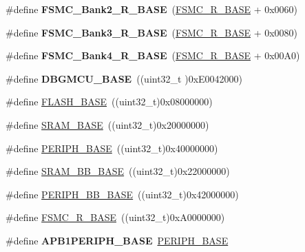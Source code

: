 \begin{DoxyCompactItemize}
\item 
\hypertarget{group___peripheral__memory__map_ga3cb46d62f4f6458e186a5a4c753e4918}{\#define {\bfseries F\-S\-M\-C\-\_\-\-Bank2\-\_\-\-R\-\_\-\-B\-A\-S\-E}~(\hyperlink{group___peripheral__memory__map_gaddf0e199dccba83272b20c9fb4d3aaed}{F\-S\-M\-C\-\_\-\-R\-\_\-\-B\-A\-S\-E} + 0x0060)}\label{group___peripheral__memory__map_ga3cb46d62f4f6458e186a5a4c753e4918}

\item 
\hypertarget{group___peripheral__memory__map_gacf056152c9e5aefcc67db78d1302c0d7}{\#define {\bfseries F\-S\-M\-C\-\_\-\-Bank3\-\_\-\-R\-\_\-\-B\-A\-S\-E}~(\hyperlink{group___peripheral__memory__map_gaddf0e199dccba83272b20c9fb4d3aaed}{F\-S\-M\-C\-\_\-\-R\-\_\-\-B\-A\-S\-E} + 0x0080)}\label{group___peripheral__memory__map_gacf056152c9e5aefcc67db78d1302c0d7}

\item 
\hypertarget{group___peripheral__memory__map_gaf9e5417133160b0bdd0498d982acec19}{\#define {\bfseries F\-S\-M\-C\-\_\-\-Bank4\-\_\-\-R\-\_\-\-B\-A\-S\-E}~(\hyperlink{group___peripheral__memory__map_gaddf0e199dccba83272b20c9fb4d3aaed}{F\-S\-M\-C\-\_\-\-R\-\_\-\-B\-A\-S\-E} + 0x00\-A0)}\label{group___peripheral__memory__map_gaf9e5417133160b0bdd0498d982acec19}

\item 
\hypertarget{group___peripheral__memory__map_ga4adaf4fd82ccc3a538f1f27a70cdbbef}{\#define {\bfseries D\-B\-G\-M\-C\-U\-\_\-\-B\-A\-S\-E}~((uint32\-\_\-t )0x\-E0042000)}\label{group___peripheral__memory__map_ga4adaf4fd82ccc3a538f1f27a70cdbbef}

\item 
\#define \hyperlink{group___peripheral__memory__map_ga23a9099a5f8fc9c6e253c0eecb2be8db}{F\-L\-A\-S\-H\-\_\-\-B\-A\-S\-E}~((uint32\-\_\-t)0x08000000)
\item 
\#define \hyperlink{group___peripheral__memory__map_ga05e8f3d2e5868754a7cd88614955aecc}{S\-R\-A\-M\-\_\-\-B\-A\-S\-E}~((uint32\-\_\-t)0x20000000)
\item 
\#define \hyperlink{group___peripheral__memory__map_ga9171f49478fa86d932f89e78e73b88b0}{P\-E\-R\-I\-P\-H\-\_\-\-B\-A\-S\-E}~((uint32\-\_\-t)0x40000000)
\item 
\#define \hyperlink{group___peripheral__memory__map_gad3548b6e2f017f39d399358f3ac98454}{S\-R\-A\-M\-\_\-\-B\-B\-\_\-\-B\-A\-S\-E}~((uint32\-\_\-t)0x22000000)
\item 
\#define \hyperlink{group___peripheral__memory__map_gaed7efc100877000845c236ccdc9e144a}{P\-E\-R\-I\-P\-H\-\_\-\-B\-B\-\_\-\-B\-A\-S\-E}~((uint32\-\_\-t)0x42000000)
\item 
\#define \hyperlink{group___peripheral__memory__map_gaddf0e199dccba83272b20c9fb4d3aaed}{F\-S\-M\-C\-\_\-\-R\-\_\-\-B\-A\-S\-E}~((uint32\-\_\-t)0x\-A0000000)
\item 
\hypertarget{group___peripheral__memory__map_ga45666d911f39addd4c8c0a0ac3388cfb}{\#define {\bfseries A\-P\-B1\-P\-E\-R\-I\-P\-H\-\_\-\-B\-A\-S\-E}~\hyperlink{group___peripheral__memory__map_ga9171f49478fa86d932f89e78e73b88b0}{P\-E\-R\-I\-P\-H\-\_\-\-B\-A\-S\-E}}\label{group___peripheral__memory__map_ga45666d911f39addd4c8c0a0ac3388cfb}


\end{DoxyCompactItemize}

